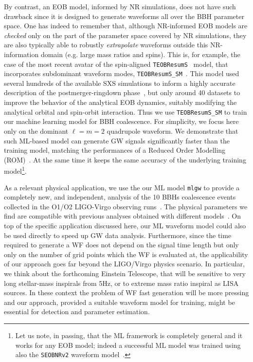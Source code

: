 By contrast, an EOB model, informed by NR simulations, does not have such drawback 
since it is designed to generate waveforms all over the BBH parameter space. 
One has indeed to remember that, although NR-informed EOB models are {\it checked} 
only on the part of the parameter space covered by NR simulations, 
they are also typically able to robustly {\it extrapolate} waveforms 
outside this NR-information domain (e.g. large mass ratios and
spins).
%
%
This is, for example, the case of the most  recent avatar of 
the spin-aligned \texttt{TEOBResumS}~\cite{Nagar:2018zoe} model, 
that incorporates subdominant waveform modes,  \texttt{TEOBResumS\_SM}~\cite{Nagar:2019wds,Nagar:2020pcj}. 
This model used several hundreds of the available SXS simulations to inform a highly accurate description 
of the postmerger-ringdown phase~\cite{Damour:2014yha}, but 
only around 40 datasets to improve the behavior of the analytical EOB dynamics, 
suitably modifying the analytical orbital and spin-orbit interaction.
Thus we use \texttt{TEOBResumS\_SM} to train our machine learning 
model for BBH coalescence. For simplicity, we focus here only on the 
dominant $\ell=m=2$ quadrupole waveform. 
We demonstrate that such ML-based model can generate 
GW signals significantly faster than the training model, 
matching the performances of a Reduced Order Modelling 
(ROM)~\cite{Purrer:2015tud,Bohe:2016gbl,Purrer:2017str}.  
At the same time it keeps the same accuracy of the underlying 
training model\footnote{Let us note, in passing, that the ML framework 
is completely general and it works for any EOB model; indeed 
a successful ML model was trained using also the \texttt{SEOBNRv2} 
waveform model~\cite{Taracchini:2013rva}.}.

As a relevant physical application, we use the our ML model \texttt{mlgw} 
to provide a completely new, and independent, analysis of the 10 BBHs 
coalescence events collected in the O1/O2 LIGO-Virgo observing 
runs~\cite{LIGOScientific:2018mvr}. The physical parameters we find are 
compatible with previous analyses obtained with different 
models~\cite{LIGOScientific:2018mvr}.
%
On top of the specific application discussed here, our ML waveform model could also be used directly 
to speed up GW data analysis.
Furthermore, since the time required to generate a WF does not depend
on the signal time length but only only on the number of grid points which the WF is evaluated at,
the applicability of our approach goes far beyond the LIGO/Virgo physics scenario. In particular,
we think about the forthcoming Einstein Telescope, that will be sensitive to very long stellar-mass 
inspirals from 5Hz, or to extreme mass ratio inspiral as LISA sources. In these context the problem
of WF fast generation will be more pressing and our approach, provided a suitable waveform model 
for training,  might be essential for detection and parameter estimation. 

